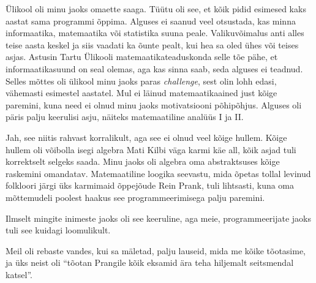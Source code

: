 
Ülikool oli minu jaoks omaette saaga. Tüütu oli see, et kõik pidid 
esimesed kaks aastat sama programmi õppima. Alguses ei saanud veel 
otsustada, kas minna informaatika, matemaatika või statistika suuna 
peale. Valikuvõimalus anti alles teise aasta keskel ja siis vaadati ka õunte 
pealt, kui hea sa oled ühes või teises asjas. Astusin Tartu Ülikooli 
matemaatikateaduskonda selle tõe pähe, et informaatikasuund on seal 
olemas, aga kas sinna saab, seda alguses ei teadnud. Selles 
mõttes oli ülikool minu jaoks paras \emph{challenge}, sest olin lohh edasi, vähemasti esimestel aastatel. Mul ei läinud
matemaatikaained just kõige paremini, kuna need ei olnud minu jaoks motivatsiooni 
põhipõhjus. Alguses oli päris palju keerulisi asju, näiteks matemaatiline analüüs I ja II.


Jah, see niitis rahvast korralikult, aga see ei olnud veel kõige hullem. Kõige 
hullem oli võibolla isegi algebra Mati Kilbi väga karmi käe all, kõik asjad tuli korrektselt selgeks saada. Minu jaoks oli
algebra oma abstraktsuses kõige raskemini omandatav. 
Matemaatiline loogika seevastu, mida õpetas tollal levinud folkloori järgi 
üks karmimaid õppejõude Rein Prank, tuli 
lihtsasti, kuna oma mõttemudeli poolest haakus see programmeerimisega palju 
paremini. 


Ilmselt mingite inimeste jaoks oli see keeruline, aga meie, programmeerijate 
jaoks tuli see kuidagi loomulikult. 


Meil oli rebaste vandes, kui sa mäletad, palju lauseid, mida me kõike 
tõotasime, ja üks neist oli \enquote{tõotan Prangile kõik eksamid ära teha 
hiljemalt seitsmendal katsel}. 


